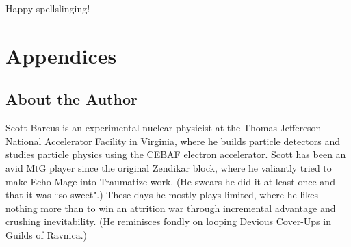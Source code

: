 \documentclass[oneside]{book}   %
\begin{document}
Happy spellslinging!

\appendix
\section*{Appendices}
\renewcommand{\thesubsection}{\Alph{subsection}}
\subsection{About the Author}

Scott Barcus is an experimental nuclear physicist at the Thomas Jeffereson National Accelerator Facility in Virginia, where he builds particle detectors and studies particle physics using the CEBAF electron accelerator. Scott has been an avid MtG player since the original Zendikar block, where he valiantly tried to make Echo Mage into Traumatize work. (He swears he did it at least once and that it was ``so sweet".) These days he mostly plays limited, where he likes nothing more than to win an attrition war through incremental advantage and crushing inevitability. (He reminisces fondly on looping Devious Cover-Ups in Guilds of Ravnica.)  




\end{document}
